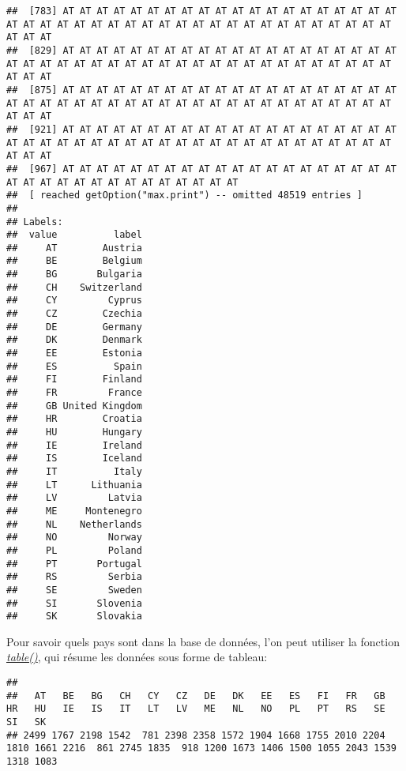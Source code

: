 \documentclass[
]{book}
\newenvironment{Shaded}{\begin{snugshade}}{\end{snugshade}}
\newcommand{\FunctionTok}[1]{\textcolor[rgb]{0.00,0.00,0.00}{#1}}
\newcommand{\NormalTok}[1]{#1}
\newcommand{\SpecialCharTok}[1]{\textcolor[rgb]{0.00,0.00,0.00}{#1}}
\begin{document}
\begin{verbatim}
##  [783] AT AT AT AT AT AT AT AT AT AT AT AT AT AT AT AT AT AT AT AT AT AT AT AT AT AT AT AT AT AT AT AT AT AT AT AT AT AT AT AT AT AT AT AT AT AT
##  [829] AT AT AT AT AT AT AT AT AT AT AT AT AT AT AT AT AT AT AT AT AT AT AT AT AT AT AT AT AT AT AT AT AT AT AT AT AT AT AT AT AT AT AT AT AT AT
##  [875] AT AT AT AT AT AT AT AT AT AT AT AT AT AT AT AT AT AT AT AT AT AT AT AT AT AT AT AT AT AT AT AT AT AT AT AT AT AT AT AT AT AT AT AT AT AT
##  [921] AT AT AT AT AT AT AT AT AT AT AT AT AT AT AT AT AT AT AT AT AT AT AT AT AT AT AT AT AT AT AT AT AT AT AT AT AT AT AT AT AT AT AT AT AT AT
##  [967] AT AT AT AT AT AT AT AT AT AT AT AT AT AT AT AT AT AT AT AT AT AT AT AT AT AT AT AT AT AT AT AT AT AT
##  [ reached getOption("max.print") -- omitted 48519 entries ]
## 
## Labels:
##  value          label
##     AT        Austria
##     BE        Belgium
##     BG       Bulgaria
##     CH    Switzerland
##     CY         Cyprus
##     CZ        Czechia
##     DE        Germany
##     DK        Denmark
##     EE        Estonia
##     ES          Spain
##     FI        Finland
##     FR         France
##     GB United Kingdom
##     HR        Croatia
##     HU        Hungary
##     IE        Ireland
##     IS        Iceland
##     IT          Italy
##     LT      Lithuania
##     LV         Latvia
##     ME     Montenegro
##     NL    Netherlands
##     NO         Norway
##     PL         Poland
##     PT       Portugal
##     RS         Serbia
##     SE         Sweden
##     SI       Slovenia
##     SK       Slovakia
\end{verbatim}

Pour savoir quels pays sont dans la base de données, l'on peut utiliser la fonction \href{https://www.rdocumentation.org/packages/base/versions/3.6.2/topics/table}{\emph{table()}}, qui résume les données sous forme de tableau:

\begin{Shaded}
\end{Shaded}

\begin{verbatim}
## 
##   AT   BE   BG   CH   CY   CZ   DE   DK   EE   ES   FI   FR   GB   HR   HU   IE   IS   IT   LT   LV   ME   NL   NO   PL   PT   RS   SE   SI   SK 
## 2499 1767 2198 1542  781 2398 2358 1572 1904 1668 1755 2010 2204 1810 1661 2216  861 2745 1835  918 1200 1673 1406 1500 1055 2043 1539 1318 1083
\end{verbatim}
\end{document}
